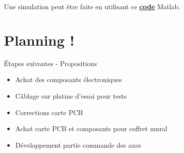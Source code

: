 \documentclass[a4paper,11pt]{beamer}
\begin{document}
\begin{frame}
\centering
Une simulation peut être faite en utilisant ce \textcolor{blue}{\textbf{\underline{\href{https://raw.githubusercontent.com/fbuloup/Interface_IAI/main/Simulation/oneAxisSimulation.m}{code}}}} Matlab.
\end{frame}

\section{Planning !}
\begin{frame}
\begin{block}{Étapes suivantes - Propositions}
\begin{itemize}
\item Achat des composants électroniques
\item Câblage sur platine d'essai pour tests
\item Corrections carte PCB
\item Achat carte PCB et composants pour coffret mural
\item Développement partie commande des axes
\end{itemize}
\end{block}
\end{frame}
\end{document}
